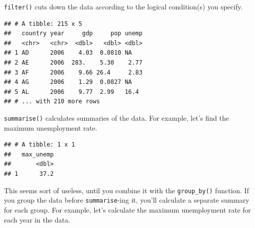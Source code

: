 \documentclass[12pt,oneside,openany]{book}
\newenvironment{Shaded}{\begin{snugshade}}{\end{snugshade}}
\newcommand{\KeywordTok}[1]{\textcolor[rgb]{0.13,0.29,0.53}{\textbf{#1}}}
\newcommand{\DataTypeTok}[1]{\textcolor[rgb]{0.13,0.29,0.53}{#1}}
\newcommand{\DecValTok}[1]{\textcolor[rgb]{0.00,0.00,0.81}{#1}}
\newcommand{\StringTok}[1]{\textcolor[rgb]{0.31,0.60,0.02}{#1}}
\newcommand{\OtherTok}[1]{\textcolor[rgb]{0.56,0.35,0.01}{#1}}
\newcommand{\OperatorTok}[1]{\textcolor[rgb]{0.81,0.36,0.00}{\textbf{#1}}}
\newcommand{\NormalTok}[1]{#1}
\begin{document}
\texttt{filter()} cuts down the data according to the logical
condition(s) you specify.

\begin{Shaded}
\end{Shaded}

\begin{verbatim}
## # A tibble: 215 x 5
##   country year     gdp     pop unemp
##   <chr>   <chr>  <dbl>   <dbl> <dbl>
## 1 AD      2006    4.03  0.0810 NA   
## 2 AE      2006  283.    5.30    2.77
## 3 AF      2006    9.66 26.4     2.83
## 4 AG      2006    1.29  0.0827 NA   
## 5 AL      2006    9.77  2.99   16.4 
## # ... with 210 more rows
\end{verbatim}

\texttt{summarise()} calculates summaries of the data. For example,
let's find the maximum unemployment rate.

\begin{Shaded}
\end{Shaded}

\begin{verbatim}
## # A tibble: 1 x 1
##   max_unemp
##       <dbl>
## 1      37.2
\end{verbatim}

This seems sort of useless, until you combine it with the
\texttt{group\_by()} function. If you group the data before
\texttt{summarise}-ing it, you'll calculate a separate summary for each
group. For example, let's calculate the maximum unemployment rate for
each year in the data.

\begin{Shaded}
\end{Shaded}
\end{document}
